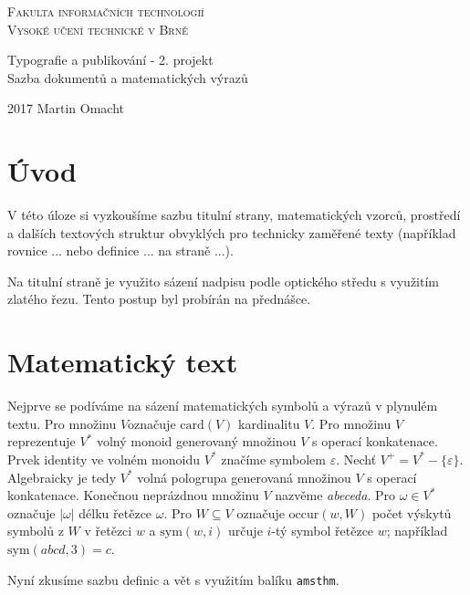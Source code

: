 \documentclass[11pt, a4paper, twocolumn]{article}
\theoremstyle{definition}
\theoremstyle{plain}
\begin{document}
	\begin{titlepage}
		\begin{center}
			{\linespread{0.75}
				\Huge
				\textsc{Fakulta informačních technologií\\ Vysoké učení technické v Brně}
			}

			{\linespread{0.8}
				\LARGE
				Typografie a publikování - 2. projekt\\
				Sazba dokumentů a matematických výrazů
			}
		\end{center}		
		{\Large 2017 \hfill Martin Omacht}
	\end{titlepage}

	\section*{Úvod} %
	\label{sec:úvod}
	V této úloze si vyzkoušíme sazbu titulní strany, matematických vzorců, prostředí a dalších textových struktur obvyklých pro technicky zaměřené texty (například rovnice ... nebo definice ... na straně ...).

	Na titulní straně je využito sázení nadpisu podle optického středu s využitím zlatého řezu. Tento postup byl probírán na přednášce.

	\section{Matematický text} %
	\label{sec:matematický_text}
	Nejprve se podíváme na sázení matematických symbolů a výrazů v plynulém textu. Pro množinu $V$označuje $\mathrm{card}(V)$ kardinalitu $V$.
	Pro množinu $V$ reprezentuje $V^\ast$ volný monoid generovaný množinou $V$ s operací konkatenace.
	Prvek identity ve volném monoidu $V^*$ značíme symbolem $\varepsilon$.
	Nechť $V^+ = V^\ast - \{\varepsilon\}$. Algebraicky je tedy $V^\ast$ volná pologrupa generovaná množinou $V$ s operací konkatenace.
	Konečnou neprázdnou množinu $V$ nazvěme \emph{abeceda}.
	Pro $\omega \in V^\ast$ označuje $|\omega|$ délku řetězce $\omega$. Pro $W \subseteq V$ označuje $\mathrm{occur}(w,W)$ počet výskytů symbolů z $W$ v řetězci $w$ a $\mathrm{sym}(w,i)$ určuje $i$-tý symbol řetězce $w$; například $\mathrm{sym}(abcd,3)=c$.

	Nyní zkusíme sazbu definic a vět s využitím balíku \texttt{amsthm}.
\end{document}

